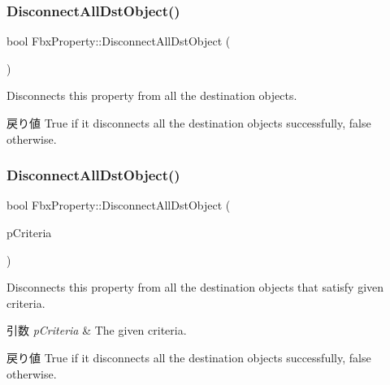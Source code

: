\subsubsection{\texorpdfstring{Disconnect\+All\+Dst\+Object()}{DisconnectAllDstObject()}\hspace{0.1cm}{\footnotesize\ttfamily [1/4]}}
{\footnotesize\ttfamily bool Fbx\+Property\+::\+Disconnect\+All\+Dst\+Object (\begin{DoxyParamCaption}{ }\end{DoxyParamCaption})}

Disconnects this property from all the destination objects. \begin{DoxyReturn}{戻り値}
{\ttfamily True} if it disconnects all the destination objects successfully, {\ttfamily false} otherwise. 
\end{DoxyReturn}
\mbox{\label{class_fbx_property_aab638ced78a12c068238b538159cf003}} 
\subsubsection{\texorpdfstring{Disconnect\+All\+Dst\+Object()}{DisconnectAllDstObject()}\hspace{0.1cm}{\footnotesize\ttfamily [2/4]}}
{\footnotesize\ttfamily bool Fbx\+Property\+::\+Disconnect\+All\+Dst\+Object (\begin{DoxyParamCaption}\item[{const \hyperlink{class_fbx_criteria}{Fbx\+Criteria} \&}]{p\+Criteria }\end{DoxyParamCaption})}

Disconnects this property from all the destination objects that satisfy given criteria. 
\begin{DoxyParams}{引数}
{\em p\+Criteria} & The given criteria. \\
\hline
\end{DoxyParams}
\begin{DoxyReturn}{戻り値}
{\ttfamily True} if it disconnects all the destination objects successfully, {\ttfamily false} otherwise. 
\end{DoxyReturn}
\mbox{\label{class_fbx_property_a9700052b15311bdbdb950fec91fe8ea8}} 
